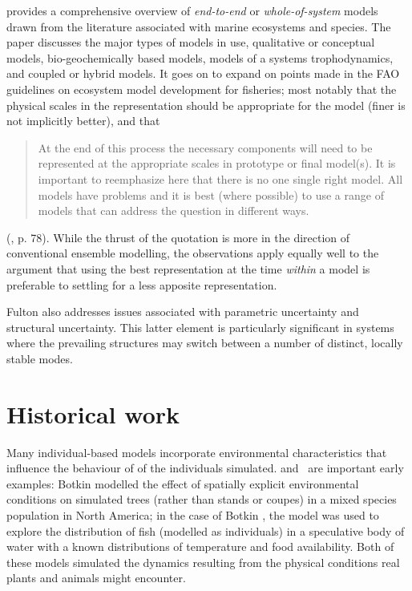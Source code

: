 \Cite{fulton2010approaches} provides a comprehensive overview
of \emph{end-to-end} or \emph{whole-of-system} models drawn from the
literature associated with marine ecosystems and species. 
The paper discusses the major types of models in use, qualitative or
conceptual models, bio-geochemically based models, models of a systems
trophodynamics, and coupled or hybrid models. It goes on to expand on
points made in the FAO guidelines on ecosystem model development for
fisheries; most notably that the physical scales in the representation
should be appropriate for the model (finer is not implicitly better), and
that
\begin{quote}
    At the end of this process the necessary components will need to
    be represented at the appropriate scales in prototype or final
    model(s). It is important to reemphasize here that there is no one
    single right model. All models have problems and it is best (where
    possible) to use a range of models that can address the question
    in different ways.
\end{quote} (\cite{FAO2008ecosystems}, p. 78).
While the thrust of the quotation is more in the direction of
conventional ensemble modelling, the observations apply equally well
to the argument that using the best representation at the
time \emph{within} a model is preferable to settling for a less
apposite representation.

Fulton also addresses issues associated with parametric uncertainty
and structural uncertainty.  This latter element is particularly
significant in systems where the prevailing structures may switch
between a number of distinct, locally stable modes.


\section{Historical work}

Many individual-based models incorporate environmental characteristics
that influence the behaviour of of the individuals
simulated.  and~\citet{deangelis1978model} are
important early examples: Botkin \etal modelled the effect of
spatially explicit environmental conditions on simulated trees (rather
than stands or coupes) in a mixed species population in
North America; in the case of Botkin \etal, the model was used to
explore the distribution of fish (modelled as individuals) in a
speculative body of water with a known distributions of temperature
and food availability. Both of these models simulated the 
dynamics resulting from the physical conditions real plants and
animals might encounter. 

